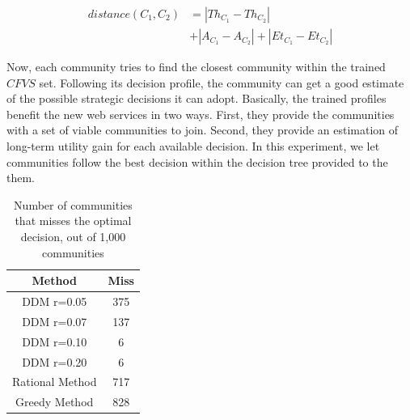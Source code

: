 \begin{equation}\label{distance_c}
\begin{split}
distance (C_1, C_2) & = |Th_{C_1} - Th_{C_2}| \\
                    & + |A_{C_1} - A_{C_2}| + |Et_{C_1} - Et_{C_2}|
\end{split}
\end{equation}

Now, each community tries to find the closest community within the trained $CFVS$ set. Following its decision profile, the community can get a good estimate of the possible strategic decisions it can adopt. Basically, the trained profiles benefit the new web services in two ways. First, they provide the communities with a set of viable communities to join. Second, they provide an estimation of long-term utility gain for each available decision. In this experiment, we let communities follow the best decision within the decision tree provided to the them.

\begin{table}[ht]
\caption{Number of communities that misses the optimal decision, out of 1,000 communities} %
\centering %
\begin{tabular}{|c|c|} %
\hline %
 Method&Miss \\ [0.5ex] %
\hline %
 DDM r=0.05& 375 \\ %
 DDM r=0.07& 137 \\
 DDM r=0.10& 6 \\
 DDM r=0.20& 6 \\
Rational Method& 717 \\
Greedy Method& 828 \\ [1ex] %
\hline %
\end{tabular}
\label{fail_rate} %
\end{table}


